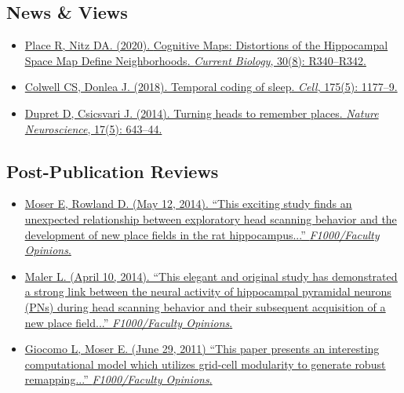 \documentclass[10pt]{article}
\newcommand{\itemtitle}[1]{{\color{hopkinsblue}\ul{#1}}}
\begin{document}
\subsection*{News \& Views}

\begin{itemize}
  \item \href{https://dx.doi.org/10.1016/j.cub.2020.02.085}
    {Place R, Nitz DA. (2020). \itemtitle{Cognitive Maps: Distortions of the Hippocampal 
      Space Map Define Neighborhoods}. \emph{Current Biology}, 30(8): R340--R342.}
  \item \href{https://dx.doi.org/10.1016/j.cell.2018.10.047}
    {Colwell CS, Donlea J. (2018). \itemtitle{Temporal coding of sleep}. \emph{Cell}, 175(5): 1177--9.}
  \item \href{https://dx.doi.org/10.1038/nn.3700}
    {Dupret D, Csicsvari J. (2014). \itemtitle{Turning heads to remember
    places}. \emph{Nature Neuroscience}, 17(5): 643--44.}
\end{itemize}

\subsection*{Post-Publication Reviews}

\begin{itemize}
  \item \href{https://facultyopinions.com/prime/718333676#eval793494783}
    {Moser E, Rowland D. (May 12, 2014). ``\itemtitle{This exciting study finds
        an unexpected relationship between exploratory head scanning behavior
      and the development of new place fields in the rat hippocampus...}”
    \emph{F1000/Faculty Opinions}.}
  \item \href{https://facultyopinions.com/prime/718333676#eval793493493}
    {Maler L. (April 10, 2014). ``\itemtitle{This elegant and original study has
        demonstrated a strong link between the neural activity of hippocampal pyramidal
        neurons (PNs) during head scanning behavior and their subsequent acquisition of
    a new place field...}'' \emph{F1000/Faculty Opinions}.}
  \item \href{https://facultyopinions.com/prime/11553956}
    {Giocomo L, Moser E. (June 29, 2011) ``\itemtitle{This paper presents an
        interesting computational model which utilizes grid-cell modularity to generate
    robust remapping...}'' \emph{F1000/Faculty Opinions}.}
\end{itemize}
\end{document}
